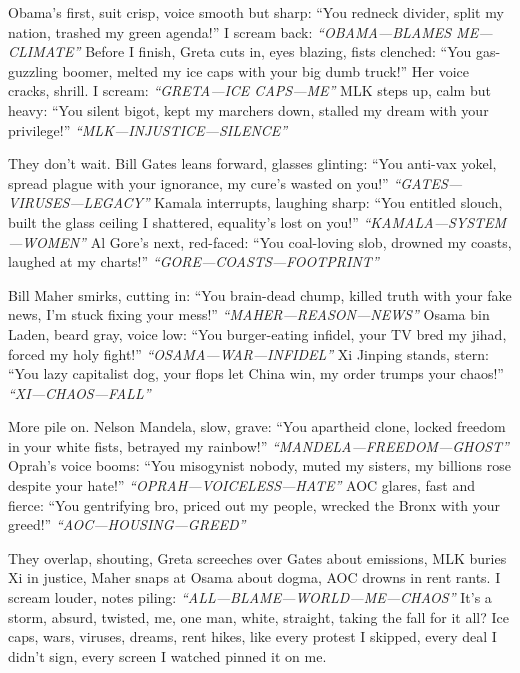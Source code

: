 \documentclass[12pt]{article}
\begin{document}
\textnormal{Obama}’s first, suit crisp, voice smooth but sharp: “You redneck divider, split my nation, trashed my green agenda!” I scream back: \textit{“OBAMA—BLAMES ME—CLIMATE”} Before I finish, \textnormal{Greta} cuts in, eyes blazing, fists clenched: “You gas-guzzling boomer, melted my ice caps with your big dumb truck!” Her voice cracks, shrill. I scream: \textit{“GRETA—ICE CAPS—ME”} \textnormal{MLK} steps up, calm but heavy: “You silent bigot, kept my marchers down, stalled my dream with your privilege!” \textit{“MLK—INJUSTICE—SILENCE”}

They don’t wait. \textnormal{Bill Gates} leans forward, glasses glinting: “You anti-vax yokel, spread plague with your ignorance, my cure’s wasted on you!” \textit{“GATES—VIRUSES—LEGACY”} \textnormal{Kamala} interrupts, laughing sharp: “You entitled slouch, built the glass ceiling I shattered, equality’s lost on you!” \textit{“KAMALA—SYSTEM—WOMEN”} \textnormal{Al Gore}’s next, red-faced: “You coal-loving slob, drowned my coasts, laughed at my charts!” \textit{“GORE—COASTS—FOOTPRINT”}

\textnormal{Bill Maher} smirks, cutting in: “You brain-dead chump, killed truth with your fake news, I’m stuck fixing your mess!” \textit{“MAHER—REASON—NEWS”} \textnormal{Osama bin Laden}, beard gray, voice low: “You burger-eating infidel, your TV bred my jihad, forced my holy fight!” \textit{“OSAMA—WAR—INFIDEL”} \textnormal{Xi Jinping} stands, stern: “You lazy capitalist dog, your flops let China win, my order trumps your chaos!” \textit{“XI—CHAOS—FALL”}

More pile on. \textnormal{Nelson Mandela}, slow, grave: “You apartheid clone, locked freedom in your white fists, betrayed my rainbow!” \textit{“MANDELA—FREEDOM—GHOST”} \textnormal{Oprah}’s voice booms: “You misogynist nobody, muted my sisters, my billions rose despite your hate!” \textit{“OPRAH—VOICELESS—HATE”} \textnormal{AOC} glares, fast and fierce: “You gentrifying bro, priced out my people, wrecked the Bronx with your greed!” \textit{“AOC—HOUSING—GREED”}

They overlap, shouting, \textnormal{Greta} screeches over \textnormal{Gates} about emissions, \textnormal{MLK} buries \textnormal{Xi} in justice, \textnormal{Maher} snaps at \textnormal{Osama} about dogma, \textnormal{AOC} drowns in rent rants. I scream louder, notes piling: \textit{“ALL—BLAME—WORLD—ME—CHAOS”} It’s a storm, absurd, twisted, me, one man, white, straight, taking the fall for it all? Ice caps, wars, viruses, dreams, rent hikes, like every protest I skipped, every deal I didn’t sign, every screen I watched pinned it on me.
\end{document}
